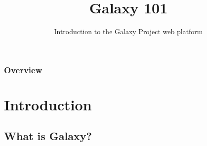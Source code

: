 \documentclass{beamer}              %
\title[Galaxy 101]{Galaxy 101}
\subtitle{Introduction to the Galaxy Project web platform}
\begin{document}
\begin{frame}
	\titlepage %
\end{frame}

\begin{frame}
	\frametitle{Overview} %
	\begin{scriptsize}
		\tableofcontents
	\end{scriptsize}
\end{frame}

\section{Introduction}

\subsection{What is Galaxy?}
\end{document}
